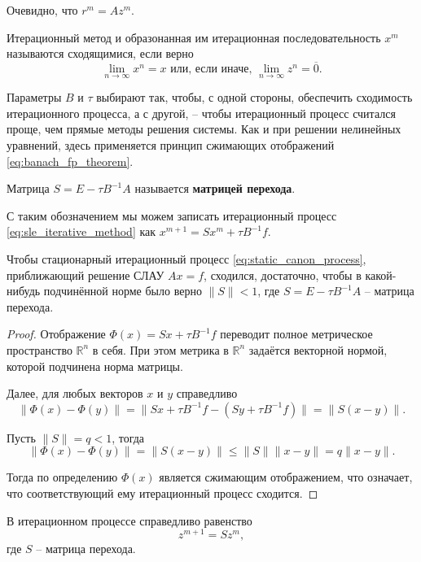 \documentclass{article}
\begin{document}
Очевидно, что $r^m=Az^m$.

\begin{define}
	Итерационный метод и образонанная им итерационная последовательность
	$x^m$ называются сходящимися, если верно
	\[\lim_{n\to\infty}x^n=x\text{ или, если иначе, }
	\lim_{n\to\infty}z^n=\overline{0}.\]
\end{define}

Параметры $B$ и $\tau$ выбирают так, чтобы, с одной стороны, обеспечить
сходимость итерационного процесса, а с другой, -- чтобы итерационный процесс
считался проще, чем прямые методы решения системы. Как и при решении нелинейных
уравнений, здесь применяется принцип сжимающих отображений
\eqref{eq:banach_fp_theorem}.

\begin{define}
	Матрица $S=E-\tau B^{-1}A$ называется \textbf{матрицей перехода}.
\end{define}

С таким обозначением мы можем записать итерационный процесс
\eqref{eq:sle_iterative_method} как $x^{m+1}=Sx^m+\tau B^{-1}f$.

\begin{theorem}
\label{eq:sle_matrix_norm_cond}
	Чтобы стационарный итерационный процесс
	\eqref{eq:static_canon_process}, приближающий решение СЛАУ $Ax=f$,
	сходился, достаточно, чтобы в какой-нибудь подчинённой норме было верно
	$\|S\|<1$, где $S=E-\tau B^{-1}A$ -- матрица перехода.
\end{theorem}

\begin{proof}
	Отображение $\Phi(x)=Sx+\tau B^{-1}f$ переводит полное метрическое
	пространство $\mathbb R^n$ в себя. При этом метрика в $\mathbb R^n$
	задаётся векторной нормой, которой подчинена норма матрицы.

	Далее, для любых векторов $x$ и $y$ справедливо
	\[\|\Phi(x)-\Phi(y)\|=\|Sx+\tau B^{-1}f-(Sy+\tau B^{-1}f)\|=
	\|S(x-y)\|.\]

	Пусть $\|S\|=q<1$, тогда
	\[\|\Phi(x)-\Phi(y)\|=\|S(x-y)\|\le\|S\|\|x-y\|=q\|x-y\|.\]

	Тогда по определению $\Phi(x)$ является сжимающим отображением, что
	означает, что соответствующий ему итерационный процесс сходится.
\end{proof}

\begin{lemma}
	В итерационном процессе справедливо равенство
	\[z^{m+1}=Sz^m,\]
	где $S$ -- матрица перехода.
\end{lemma}
\end{document}
